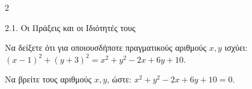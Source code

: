 \begin{ylh}{2}
    \item 2.1. Οι Πράξεις και οι Ιδιότητές τους
\end{ylh}

\begin{alist}
\item Να δείξετε ότι για οποιουσδήποτε πραγματικούς αριθμούς $x, y$ ισχύει:
$(x - 1)^2 + (y + 3)^2 = x^2 + y^2 - 2x + 6y + 10$.
\item Να βρείτε τους αριθμούς $x, y$, ώστε: $x^2 + y^2 - 2x + 6y + 10 = 0$.
\end{alist}

